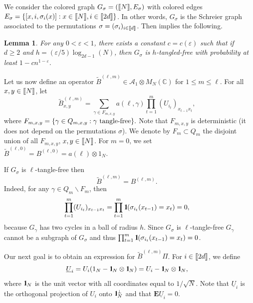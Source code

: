\documentclass[11pt]{article}
\newtheorem{lemma}{Lemma}[section]
\newcommand{\cA}{\mathcal{A}}
\newcommand{\dE}{\mathbf {E}}
\newcommand{\dC}{\mathbb {C}}
\newcommand{\1}{1\!\!{\sf I}}
\newcommand{\IND}{\1}
\newcommand{\veps}{\varepsilon}
\newcommand{\INT}[1]{{{\left[\hspace{-1.4pt}\left[#1\right]\hspace{-1.4pt}\right]}}}
\begin{document}
We consider the colored graph $G_\sigma = (\INT{N},E_\sigma)$ with colored edges $E _\sigma = \{ [x,i,\sigma_i(x)] :  x \in \INT{N}, i \in \INT{2d}\}$. In other words, $G_\sigma$ is the Schreier graph associated to the permutations $\sigma = (\sigma_i)_{i \in \INT{d}}$. Then \cite[Lemma 23]{MR4024563} implies the following.  
\begin{lemma}\label{le:probtf}
For any $0 < \veps < 1$, there exists a constant $c = c(\veps)$ such that if $d \geq 2$ and $h =  ( \veps / 5)\log _{2d -1} (N) $, then $G_\sigma$ is $h$-tangled-free with probability at least $1  - c n^{1-\veps}$.   
\end{lemma}

Let us now define an operator $\widetilde B^{(\ell,m)} \in \cA_1 \otimes M_N(\dC)$ for $1 \leq m \leq \ell$.  For all $x,y \in \INT{N}$, let 
\begin{equation}\label{eq:defwtBlm}
\widetilde B^{(\ell,m)}_{x,y} =  \sum_{\gamma \in F_{m,x,y}} a(\ell,\gamma) \prod_{t=1}^{m} (U_{i_t})_{x_{t-1} x_t} ,
\end{equation}
where 
$
F_{m,x,y} = \{ \gamma \in Q_{m,x,y} : \gamma \hbox{ tangle-free}\}.
$
Note that $F_{m,x,y}$ is deterministic (it does not depend on the permutations $\sigma$). We denote by $F_m \subset Q_m$ the disjoint union of all $F_{m,x,y}$, $x,y \in \INT{N}$. For $m=0$, we set $\widetilde B^{(\ell,0)} = B^{(\ell,0)} = a(\ell) \otimes 1_N$.

If $G_\sigma$ is $\ell$-tangle-free then 
\begin{equation}\label{eq:wttoP}
\widetilde B^{(\ell,m)}  =  B^{(\ell,m)}.
\end{equation}
Indeed, for any $\gamma \in Q_m \backslash F_m$, then 
$$\prod_{t=1}^{m} (U_{i_t})_{x_{t-1} x_t} = \prod_{t=1}^{m} \IND ( \sigma_{i_t}(x_{t-1}) = x_t) = 0,$$
because $G_\gamma$ has two cycles in a ball of radius $h$. Since  $G_\sigma$ is $\ell$-tangle-free $G_\gamma$ cannot be a subgraph of $G_\sigma$ and thus  $\prod_{t=1}^{m} \IND ( \sigma_{i_t}(x_{t-1}) = x_t) = 0$.

Our next goal is to obtain an expression for $\widetilde B^{(\ell,m)} \Pi$. For $i \in \INT{2d}$, we define 
\begin{equation}\label{eq:defS}
\underline U_{i }  = U_{i } (1_N - \IND_N \otimes \IND_N)  = U_{i}- \IND_N \otimes \IND_N ,
\end{equation}
where $\IND_N$ is the unit vector with all coordinates equal to $1/\sqrt N$. Note that $\underline U_i$ is the orthogonal projection of $U_i$ onto $\IND_N^\perp$ and that $ \dE \underline U_i = 0$. 
\end{document}
